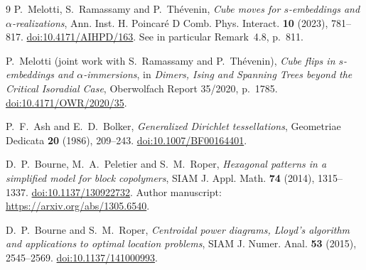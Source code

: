\documentclass[11pt]{article}
\begin{document}
\begin{thebibliography}{9}
P.~Melotti, S.~Ramassamy and P.~Th\'evenin,
\emph{Cube moves for $s$-embeddings and $\alpha$-realizations},
Ann. Inst. H. Poincar\'e D Comb. Phys. Interact. \textbf{10} (2023), 781--817.
\href{https://doi.org/10.4171/AIHPD/163}{doi:10.4171/AIHPD/163}.
See in particular Remark~4.8, p.~811.

P.~Melotti (joint work with S.~Ramassamy and P.~Th\'evenin),
\emph{Cube flips in $s$-embeddings and $\alpha$-immersions},
in \emph{Dimers, Ising and Spanning Trees beyond the Critical Isoradial Case},
Oberwolfach Report 35/2020, p.~1785.
\href{https://doi.org/10.4171/OWR/2020/35}{doi:10.4171/OWR/2020/35}.

P.~F.~Ash and E.~D.~Bolker,
\emph{Generalized Dirichlet tessellations},
Geometriae Dedicata \textbf{20} (1986), 209--243.
\href{https://doi.org/10.1007/BF00164401}{doi:10.1007/BF00164401}.

D.~P.~Bourne, M.~A.~Peletier and S.~M.~Roper,
\emph{Hexagonal patterns in a simplified model for block copolymers},
SIAM J. Appl. Math. \textbf{74} (2014), 1315--1337.
\href{https://doi.org/10.1137/130922732}{doi:10.1137/130922732}.
Author manuscript: \url{https://arxiv.org/abs/1305.6540}.

D.~P.~Bourne and S.~M.~Roper,
\emph{Centroidal power diagrams, Lloyd's algorithm and applications to optimal location problems},
SIAM J. Numer. Anal. \textbf{53} (2015), 2545--2569.
\href{https://doi.org/10.1137/141000993}{doi:10.1137/141000993}.
\end{thebibliography}
\end{document}
